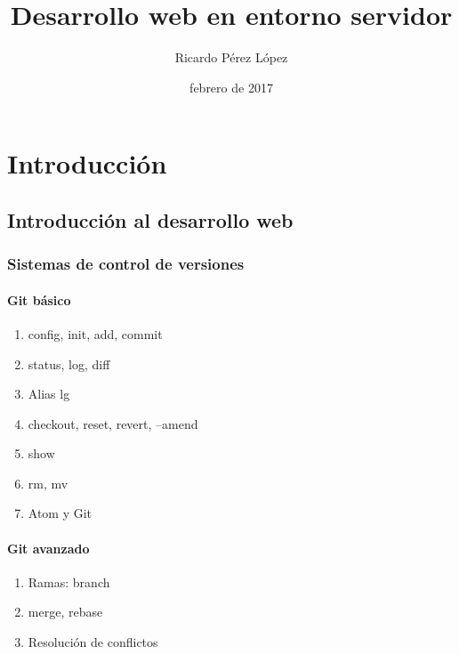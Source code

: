 \documentclass[a4paper,11pt,spanish]{sphinxmanual}
\title{Desarrollo web en entorno servidor}
\date{febrero de 2017}
\author{Ricardo Pérez López}
\begin{document}
\maketitle
\sphinxtableofcontents
{}\label{\detokenize{index::doc}}



\part{Introducción}
\label{\detokenize{introduccion:introduccion}}\label{\detokenize{introduccion:desarrollo-web-en-entorno-servidor}}\label{\detokenize{introduccion::doc}}

\chapter{Introducción al desarrollo web}
\label{\detokenize{introduccion:introduccion-al-desarrollo-web}}

\section{Sistemas de control de versiones}
\label{\detokenize{introduccion:sistemas-de-control-de-versiones}}

\subsection{Git básico}
\label{\detokenize{introduccion:git-basico}}\begin{enumerate}
\item {} 
config, init, add, commit

\item {} 
status, log, diff

\item {} 
Alias lg

\item {} 
checkout, reset, revert, --amend

\item {} 
show

\item {} 
rm, mv

\item {} 
Atom y Git

\end{enumerate}


\subsection{Git avanzado}
\label{\detokenize{introduccion:git-avanzado}}\begin{enumerate}
\item {} 
Ramas: branch

\item {} 
merge, rebase

\item {} 
Resolución de conflictos

\end{enumerate}
\end{document}
